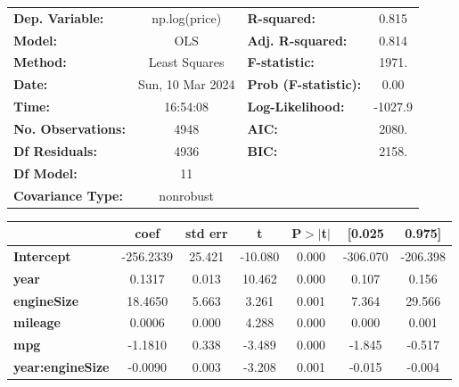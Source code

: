 \documentclass[
  letterpaper,
  DIV=11,
  numbers=noendperiod]{scrreprt}
\begin{document}
\begin{center}
\begin{tabular}{lclc}
\toprule
\textbf{Dep. Variable:}     &  np.log(price)   & \textbf{  R-squared:         } &     0.815   \\
\textbf{Model:}             &       OLS        & \textbf{  Adj. R-squared:    } &     0.814   \\
\textbf{Method:}            &  Least Squares   & \textbf{  F-statistic:       } &     1971.   \\
\textbf{Date:}              & Sun, 10 Mar 2024 & \textbf{  Prob (F-statistic):} &     0.00    \\
\textbf{Time:}              &     16:54:08     & \textbf{  Log-Likelihood:    } &   -1027.9   \\
\textbf{No. Observations:}  &        4948      & \textbf{  AIC:               } &     2080.   \\
\textbf{Df Residuals:}      &        4936      & \textbf{  BIC:               } &     2158.   \\
\textbf{Df Model:}          &          11      & \textbf{                     } &             \\
\textbf{Covariance Type:}   &    nonrobust     & \textbf{                     } &             \\
\bottomrule
\end{tabular}
\begin{tabular}{lcccccc}
                            & \textbf{coef} & \textbf{std err} & \textbf{t} & \textbf{P$> |$t$|$} & \textbf{[0.025} & \textbf{0.975]}  \\
\midrule
\textbf{Intercept}          &    -256.2339  &       25.421     &   -10.080  &         0.000        &     -306.070    &     -206.398     \\
\textbf{year}               &       0.1317  &        0.013     &    10.462  &         0.000        &        0.107    &        0.156     \\
\textbf{engineSize}         &      18.4650  &        5.663     &     3.261  &         0.001        &        7.364    &       29.566     \\
\textbf{mileage}            &       0.0006  &        0.000     &     4.288  &         0.000        &        0.000    &        0.001     \\
\textbf{mpg}                &      -1.1810  &        0.338     &    -3.489  &         0.000        &       -1.845    &       -0.517     \\
\textbf{year:engineSize}    &      -0.0090  &        0.003     &    -3.208  &         0.001        &       -0.015    &       -0.004     \\

\end{tabular}
\end{center}
\end{document}
